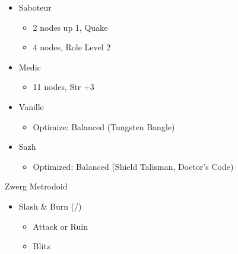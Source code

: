 \begin{multicols}{2}
\begin{menu}
\begin{itemize}
\begin{itemize}
\begin{itemize}
\begin{itemize}
                \item 2 nodes, Role Level 2
            \end{itemize}
            \item Saboteur
            \begin{itemize}
                \item 2 nodes up 1, Quake
                \item 4 nodes, Role Level 2
            \end{itemize}
            \item Medic
            \begin{itemize}
                \item 11 nodes, Str +3
            \end{itemize}
        \end{itemize}
    \end{itemize}
    \columnbreak
    \equip
    \begin{itemize}
        \item Vanille
        \begin{itemize}
            \item \begin{flushleft}Optimize: Balanced (Tungsten Bangle)\end{flushleft}
        \end{itemize}
        \item Sazh
        \begin{itemize}
            \item \begin{flushleft}Optimized: Balanced (Shield Talisman, Doctor's Code)\end{flushleft}
        \end{itemize}
    \end{itemize}
\end{itemize}
\end{menu}
\renewcommand{\first}{[1] Slash \& Burn (\com/\rav)}
\renewcommand{\second}{[2] War \& Peace (\com/\med)}
\renewcommand{\third}{[3] Tide Turner (\syn/\sab)}
\renewcommand{\fourth}{[4] }
\renewcommand{\fifth}{[5] Undermine (\rav/\sab)}
\renewcommand{\sixth}{[6] Divide \& Conquer (\com/\sab)}

\begin{battle}{Zwerg Metrodoid}
\begin{itemize}
    \item \first
    \begin{itemize}
        \item Attack or Ruin
        \item Blitz
    \end{itemize}
\end{itemize}
\end{battle}


\end{multicols}
